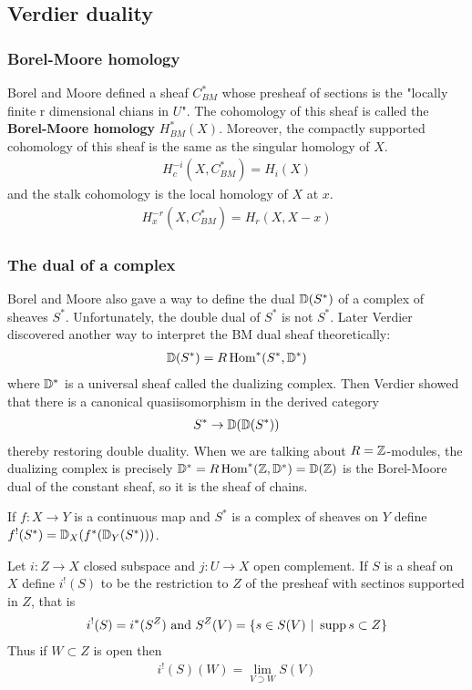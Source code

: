 \subsection{Verdier duality}
\subsubsection{Borel-Moore homology}
Borel and Moore defined a sheaf $C^*_{BM}$ whose presheaf of sections is the 
"locally finite r dimensional chians in $U$". The cohomology of this sheaf is called the 
\textbf{Borel-Moore homology} $H^*_{BM}(X)$. Moreover,
the compactly supported cohomology of this sheaf is the same as the singular homology of $X$.
\begin{align*}
    H^{-i}_c(X,C^*_{BM}) = H_i(X)
\end{align*} and the stalk cohomology is the local homology of $X$ at $x$. \begin{align*}
    H^{-r}_x(X,C^*_{BM}) = H_r(X,X-x)
\end{align*}

\subsubsection{The dual of a complex}
Borel and Moore also gave a way to define the dual $\mathbb{D}(S^*)$ of a complex of sheaves $S^*$.
Unfortunately, the double dual of $S^*$ is not $S^*$. Later
Verdier discovered another way to interpret the BM dual sheaf theoretically:
\begin{align*}
    \mathbb{D}(S^*) = R\operatorname{Hom}^*(S^*,\mathbb{D}^*)
\end{align*} where $\mathbb{D}^*$ is a universal sheaf called the dualizing complex. Then 
Verdier showed that there is a canonical quasiisomorphism
in the derived category \begin{align*}
    S^* \to \mathbb{D}(\mathbb{D}(S^*))
\end{align*} thereby restoring double duality. When we are talking about $R=\mathbb{Z}$-modules,
the dualizing complex is precisely $\mathbb{D}^* =  R\operatorname{Hom}^*(\mathbb{Z},\mathbb{D}^*) = \mathbb{D}(\mathbb{Z})$ is the 
Borel-Moore dual of the constant sheaf, so it is the sheaf of chains.

\begin{definition}
    If $f:X\to Y$ is a continuous map and $S^*$ is a complex of sheaves on $Y$
    define $f^!(S^*) = \mathbb{D}_X(f^*(\mathbb{D}_Y(S^*)))$.
\end{definition}

\begin{definition}
    Let $i:Z\to X$ closed subspace and $j:U\to X$ open complement. 
    If $S$ is a sheaf on $X$ define $i^!(S)$ to be the restriction to $Z$ of the 
    presheaf with sectinos supported in $Z$, that is \begin{align*}
        i^!(S) = i^*(S^Z) \text{ and } S^Z(V) = \{s\in S(V) \ \vert \  \operatorname{supp} s \subset Z\}
    \end{align*} Thus if $W\subset Z$ is open then \begin{align*}
        i^!(S)(W) = \lim_{V\supset W} S(V)
    \end{align*}
\end{definition}

